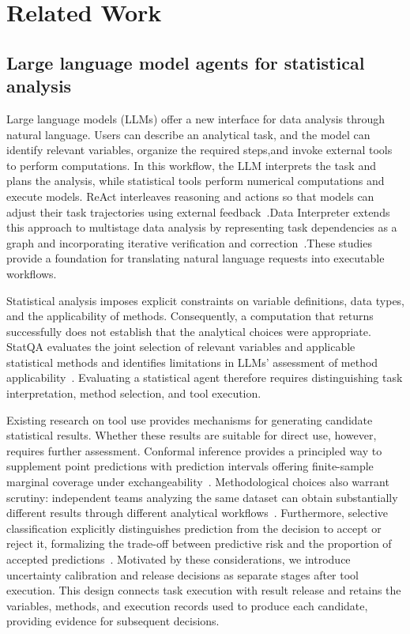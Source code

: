 \documentclass[preprint,12pt,authoryear]{elsarticle}
\begin{document}
\section{Related Work}
\subsection{Large language model agents for statistical analysis}
\label{subsec:statistical_agents}
Large language models (LLMs) offer a new interface for data analysis through natural language. Users can describe an analytical task, and the model can identify relevant variables, organize the required steps,and invoke external tools to perform computations. In this workflow, the LLM interprets the task and plans the analysis, while statistical tools perform numerical computations and execute models. ReAct interleaves reasoning and actions so that models can adjust their task trajectories using external feedback~\citep{yao2023react}.Data Interpreter extends this approach to multistage data analysis by representing task dependencies as a graph and incorporating iterative verification and correction~\citep{hong2025data}.These studies provide a foundation for translating natural language requests into executable workflows.

Statistical analysis imposes explicit constraints on variable definitions, data types, and the applicability of methods. Consequently, a computation that returns successfully does not establish that the analytical choices were appropriate. StatQA evaluates the joint selection of relevant variables and applicable statistical methods and identifies limitations in LLMs' assessment of method applicability~\citep{zhu2024large}. Evaluating a statistical agent therefore requires distinguishing task interpretation, method selection, and tool execution. 

Existing research on tool use provides mechanisms for generating candidate statistical results. Whether these results are suitable for direct use, however, requires further assessment. Conformal inference provides a principled way to supplement point predictions with prediction intervals offering finite-sample marginal coverage under exchangeability~\citep{lei2018distribution}. Methodological choices also warrant scrutiny: independent teams analyzing the same dataset can obtain substantially different results through different analytical workflows~\citep{botvinik2020variability}. Furthermore, selective classification explicitly distinguishes prediction from the decision to accept or reject it, formalizing the trade-off between predictive risk and the proportion of accepted predictions~\citep{elyaniv2010foundations}. Motivated by these considerations, we introduce uncertainty calibration and release decisions as separate stages after tool execution. This design connects task execution with result release and retains the variables, methods, and execution records used to produce each candidate, providing evidence for subsequent decisions.
\end{document}
